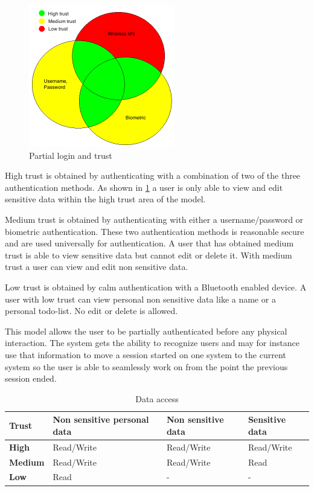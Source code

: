 \begin{figure}[!t]
	\centering
	\includegraphics[width=2.5in]{img/authenticationModel}
	\caption{ Partial login and trust }
	\label{fig_authentication_model}
\end{figure}

High trust is obtained by authenticating with a combination of two of the three authentication methods.
As shown in \cref{table_data_access} a user is only able to view and edit sensitive data within the high trust area of the model.

Medium trust is obtained by authenticating with either a username/password or biometric authentication.
These two authentication methods is reasonable secure and are used universally for authentication.
A user that has obtained medium trust is able to view sensitive data but cannot edit or delete it.
With medium trust a user can view and edit non sensitive data.

Low trust is obtained by calm authentication with a Bluetooth enabled device.
A user with low trust can view personal non sensitive data like a name or a personal todo-list.
No edit or delete is allowed.

This model allows the user to be partially authenticated before any physical interaction.
The system gets the ability to recognize users and may for instance use that information to move a session started on one system to the current system so the user is able to seamlessly work on from the point the previous session ended.

\begin{table}[!t]
\caption{Data access}
\label{table_data_access}
\centering
\begin{tabular}{|p{1.3cm}|p{2.0cm}|p{2.0cm}|p{2.0cm}|}
\hline
\textbf{Trust} & \textbf{Non sensitive personal data} & \textbf{Non sensitive data} & \textbf{Sensitive data}\\
\hline
\textbf{High} & Read/Write & Read/Write & Read/Write\\
\hline
\textbf{Medium} & Read/Write & Read/Write & Read\\
\hline
\textbf{Low} & Read & - & -\\
\hline
\end{tabular}
\end{table}